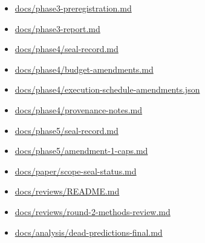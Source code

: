 \documentclass[11pt]{article}
\providecommand{\tightlist}{\setlength{\itemsep}{0pt}\setlength{\parskip}{0pt}}
\begin{document}
\begin{itemize}
\tightlist
\item
  \href{https://github.com/yoheinakajima/synthetic-players/blob/62ab90beff1d291b069c87f13b6b6b3495171ddd/docs/phase3-preregistration.md}{docs/phase3-preregistration.md}
\item
  \href{https://github.com/yoheinakajima/synthetic-players/blob/62ab90beff1d291b069c87f13b6b6b3495171ddd/docs/phase3-report.md}{docs/phase3-report.md}
\item
  \href{https://github.com/yoheinakajima/synthetic-players/blob/62ab90beff1d291b069c87f13b6b6b3495171ddd/docs/phase4/seal-record.md}{docs/phase4/seal-record.md}
\item
  \href{https://github.com/yoheinakajima/synthetic-players/blob/62ab90beff1d291b069c87f13b6b6b3495171ddd/docs/phase4/budget-amendments.md}{docs/phase4/budget-amendments.md}
\item
  \href{https://github.com/yoheinakajima/synthetic-players/blob/62ab90beff1d291b069c87f13b6b6b3495171ddd/docs/phase4/execution-schedule-amendments.json}{docs/phase4/execution-schedule-amendments.json}
\item
  \href{https://github.com/yoheinakajima/synthetic-players/blob/62ab90beff1d291b069c87f13b6b6b3495171ddd/docs/phase4/provenance-notes.md}{docs/phase4/provenance-notes.md}
\item
  \href{https://github.com/yoheinakajima/synthetic-players/blob/62ab90beff1d291b069c87f13b6b6b3495171ddd/docs/phase5/seal-record.md}{docs/phase5/seal-record.md}
\item
  \href{https://github.com/yoheinakajima/synthetic-players/blob/62ab90beff1d291b069c87f13b6b6b3495171ddd/docs/phase5/amendment-1-caps.md}{docs/phase5/amendment-1-caps.md}
\item
  \href{https://github.com/yoheinakajima/synthetic-players/blob/62ab90beff1d291b069c87f13b6b6b3495171ddd/docs/paper/scope-seal-status.md}{docs/paper/scope-seal-status.md}
\item
  \href{https://github.com/yoheinakajima/synthetic-players/blob/62ab90beff1d291b069c87f13b6b6b3495171ddd/docs/reviews/README.md}{docs/reviews/README.md}
\item
  \href{https://github.com/yoheinakajima/synthetic-players/blob/62ab90beff1d291b069c87f13b6b6b3495171ddd/docs/reviews/round-2-methods-review.md}{docs/reviews/round-2-methods-review.md}
\item
  \href{https://github.com/yoheinakajima/synthetic-players/blob/62ab90beff1d291b069c87f13b6b6b3495171ddd/docs/analysis/dead-predictions-final.md}{docs/analysis/dead-predictions-final.md}
\end{itemize}
\end{document}
